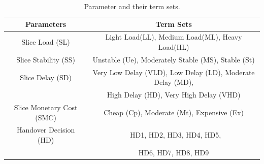 \documentclass[graybox]{svmult}
\begin{document}
\begin{table}\centering
	\caption{Parameter and their term sets.}
	\label{tab:Parameter}%
	\begin{tabular}{c | c }\hline
		Parameters & Term Sets \\\hline
	    Slice Load (SL) & Light Load(LL), Medium Load(ML), Heavy Load(HL) \\\hline
		Slice Stability (SS) & Unstable (Ue), Moderately Stable (MS), Stable (St) \\\hline
		Slice Delay (SD) & Very Low Delay (VLD), Low Delay (LD), Moderate Delay (MD), \\
		&High Delay (HD), Very High Delay (VHD) \\\hline
		Slice Monetary Cost (SMC) & Cheap (Cp), Moderate (Mt), Expensive (Ex) \\\hline 
		Handover Decision (HD) & ~HD1, HD2, HD3, HD4, HD5, \\
		& HD6, HD7, HD8, HD9\\
		\hline
	\end{tabular}	
\end{table}
\end{document}
